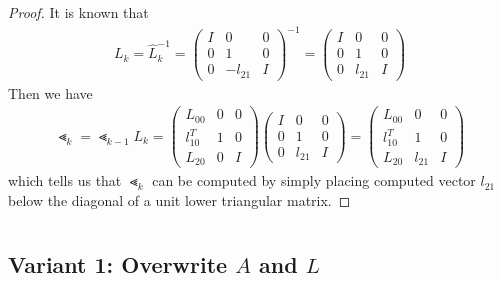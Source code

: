 \documentclass[11pt,a4paper]{article}
\begin{document}
\begin{proof}
    It is known that 
    \begin{align}
        L_k = \hat{L}_{k}^{-1} = 
       \left( \begin{array}{c|c|c} 
               I & 0 & 0 \\ \hline 
               0 & 1 & 0 \\ \hline
               0 & -l_{21} & I
           \end{array} \right)^{-1}
       =
       \left( \begin{array}{c|c|c} 
               I & 0 & 0 \\ \hline 
               0 & 1 & 0 \\ \hline
               0 & l_{21} & I
           \end{array} \right)
    \end{align}
    Then we have
    \begin{align} 
        \Lt_k = \Lt_{k-1} L_k  
        =  
        \left( \begin{array}{c|c|c} 
               L_{00} & 0 & 0 \\ \hline 
               l_{10}^T & 1 & 0 \\ \hline
               L_{20} & 0 & I
        \end{array} \right)
        \left( \begin{array}{c|c|c} 
               I & 0 & 0 \\ \hline 
               0 & 1 & 0 \\ \hline
               0 & l_{21} & I
           \end{array} \right)
       =  
       \left( \begin{array}{c|c|c} 
               L_{00} & 0 & 0 \\ \hline 
               l_{10}^T & 1 & 0 \\ \hline
               L_{20} & l_{21} & I
        \end{array} \right)
    \end{align}
    which tells us that $\Lt_k$ can be computed by simply placing computed
    vector $l_{21}$ below the diagonal of a unit lower triangular matrix.
\end{proof}
\newpage
\setcounter{section}{11}
\section{}
\subsection{Variant 1: Overwrite $A$ and $L$}

\end{document}

